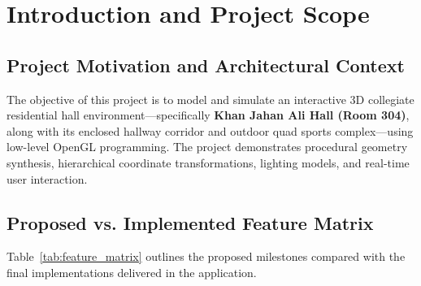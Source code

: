 \documentclass[11pt,a4paper]{article}
\begin{document}
\section{Introduction and Project Scope}

\subsection{Project Motivation and Architectural Context}
The objective of this project is to model and simulate an interactive 3D collegiate residential hall environment---specifically \textbf{Khan Jahan Ali Hall (Room 304)}, along with its enclosed hallway corridor and outdoor quad sports complex---using low-level OpenGL programming. The project demonstrates procedural geometry synthesis, hierarchical coordinate transformations, lighting models, and real-time user interaction.

\subsection{Proposed vs. Implemented Feature Matrix}
Table~\ref{tab:feature_matrix} outlines the proposed milestones compared with the final implementations delivered in the application.
\end{document}
